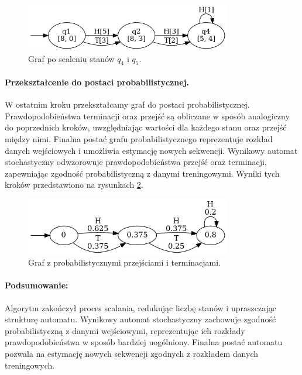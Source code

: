 \begin{figure}[ht]
    \centering
    \includegraphics[width=0.8\textwidth]{images/run_example/alergia/3.png}
    \caption{Graf po scaleniu stanów \( q_4 \) i \( q_5 \).}
    \label{fig:alergia_example_3}
\end{figure}  

\paragraph*{Przekształcenie do postaci probabilistycznej.}  
W ostatnim kroku przekształcamy graf do postaci probabilistycznej. Prawdopodobieństwa terminacji oraz przejść są obliczane w sposób analogiczny do poprzednich kroków, uwzględniając wartości dla każdego stanu oraz przejść między nimi. Finalna postać grafu probabilistycznego reprezentuje rozkład danych wejściowych i umożliwia estymację nowych sekwencji. Wynikowy automat stochastyczny odwzorowuje prawdopodobieństwa przejść oraz terminacji, zapewniając zgodność probabilistyczną z danymi treningowymi. Wyniki tych kroków przedstawiono na rysunkach \ref{fig:alergia_example_4}.  

\begin{figure}[ht]
    \centering
    \includegraphics[width=0.8\textwidth]{images/run_example/alergia/4.png}
    \caption{Graf z probabilistycznymi przejściami i terminacjami.}
    \label{fig:alergia_example_4}
\end{figure}  

\paragraph*{Podsumowanie:}  
Algorytm zakończył proces scalania, redukując liczbę stanów i upraszczając strukturę automatu. Wynikowy automat stochastyczny zachowuje zgodność probabilistyczną z danymi wejściowymi, reprezentując ich rozkłady prawdopodobieństwa w sposób bardziej uogólniony. Finalna postać automatu pozwala na estymację nowych sekwencji zgodnych z rozkładem danych treningowych.  
